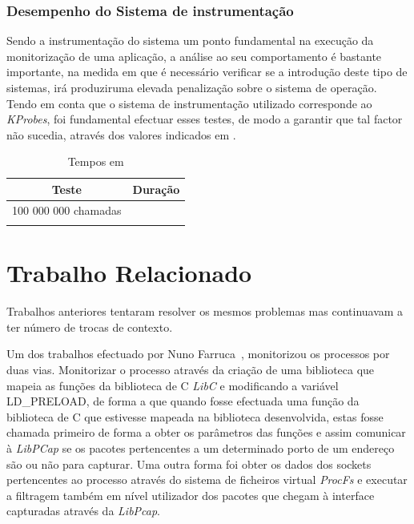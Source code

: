 \documentclass[a4paper]{llncs}
\begin{document}
\subsubsection{Desempenho do Sistema de instrumentação}
Sendo a instrumentação do sistema um ponto fundamental na execução da monitorização de uma aplicação, a análise ao seu comportamento é bastante importante, na medida em que é necessário verificar se a introdução deste tipo de sistemas, irá produziruma elevada penalização sobre o sistema de operação. Tendo em conta que o sistema de instrumentação utilizado corresponde ao \textit{KProbes}, foi fundamental efectuar esses testes, de modo a garantir que tal factor não sucedia, através dos valores indicados em \cite{KProbeKernel}.

\begin{table}
\begin{center}

\begin{tabular}{ | c | c |  }
\hline
Teste & \hspace{1cm}Duração\hspace{1cm} \\
\hline
100 000 000 chamadas & \\
\hline
 & \\
\hline

\hline
\end{tabular}
\caption{Tempos em }
\label{tab:kprobes_info}
\end{center}
\end{table}


\section{Trabalho Relacionado}
\label{sec:related_work}
Trabalhos anteriores tentaram resolver os mesmos problemas mas continuavam a ter número de trocas de contexto.

Um dos trabalhos efectuado por Nuno Farruca~\cite{Farruca:2009,duarte10}, monitorizou os processos por duas vias. Monitorizar o processo através da criação de uma biblioteca que mapeia as funções da biblioteca de C \textit{LibC} e modificando a variável LD\_PRELOAD, de forma a que quando fosse efectuada uma função da biblioteca de C que estivesse mapeada na biblioteca desenvolvida, estas fosse chamada primeiro de forma a obter os parâmetros das funções e assim comunicar à \textit{LibPCap} se os pacotes pertencentes a um determinado porto de um endereço são ou não para capturar. Uma outra forma foi obter os dados dos sockets pertencentes ao processo através do sistema de ficheiros virtual \textit{ProcFs} e executar a filtragem também em nível utilizador dos pacotes que chegam à interface capturadas através da \textit{LibPcap}.
\end{document}
